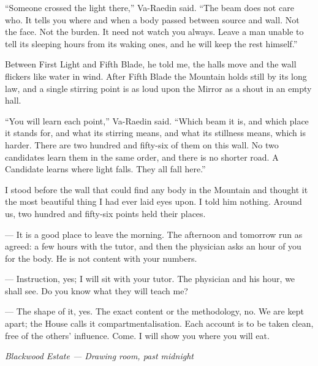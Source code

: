 ``Someone crossed the light there,'' Va-Raedin said. ``The beam does not care who. It tells you where and when a body passed between source and wall. Not the face. Not the burden. It need not watch you always. Leave a man unable to tell its sleeping hours from its waking ones, and he will keep the rest himself.''\par

Between First Light and Fifth Blade, he told me, the halls move and the wall flickers like water in wind. After Fifth Blade the Mountain holds still by its long law, and a single stirring point is as loud upon the Mirror as a shout in an empty hall.\par

``You will learn each point,'' Va-Raedin said. ``Which beam it is, and which place it stands for, and what its stirring means, and what its stillness means, which is harder. 
There are two hundred and fifty-six of them on this wall. No two candidates learn them in the same order, and there is no shorter road. A Candidate learns where light falls. They all fall here.''\par

I stood before the wall that could find any body in the Mountain and thought it the most beautiful thing I had ever laid eyes upon. I told him nothing. Around us, two hundred and fifty-six points held their places.\par

\begin{room}

--- It is a good place to leave the morning. The afternoon and tomorrow run as agreed: a few hours with the tutor, and then the physician asks an hour of you for the body. He is not content with your numbers.

--- Instruction, yes; I will sit with your tutor. The physician and his hour, we shall see. Do you know what they will teach me?

--- The shape of it, yes. The exact content or the methodology, no. We are kept apart; the House calls it compartmentalisation. Each account is to be taken clean, free of the others' influence. Come. I will show you where you will eat.

\end{room}

\begin{center}\small\itshape Blackwood Estate --- Drawing room, past midnight\end{center}

